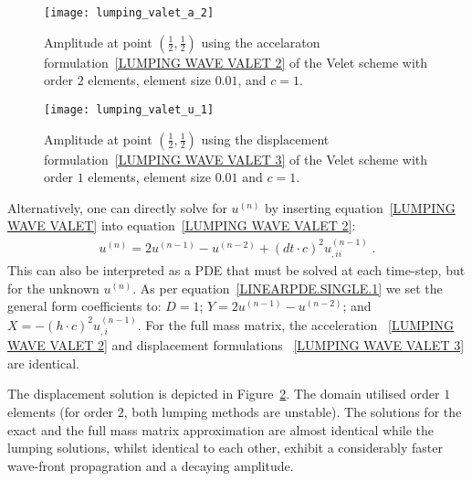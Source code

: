 \begin{figure}[ht]
\centerline{\texttt{[image: lumping\_valet\_a\_2]}}
\caption{Amplitude at point $(\frac{1}{2},\frac{1}{2})$ using the accelaraton formulation~\ref{LUMPING WAVE VALET 2} of the 
Velet scheme with order $2$ elements, element size $0.01$, and $c=1$.}
\label{FIG LUMPING VALET B}
\end{figure}

\begin{figure}[ht]
\centerline{\texttt{[image: lumping\_valet\_u\_1]}}
\caption{Amplitude at point $(\frac{1}{2},\frac{1}{2})$ using the displacement formulation~\ref{LUMPING WAVE VALET 3} of the 
Velet scheme with order $1$ elements, element size $0.01$ and $c=1$.}
\label{FIG LUMPING VALET C}
\end{figure}

Alternatively, one can directly solve for $u^{(n)}$ by inserting 
equation~\ref{LUMPING WAVE VALET} into equation~\ref{LUMPING WAVE VALET 2}:
\begin{eqnarray} \label{LUMPING WAVE VALET 3} 
u^{(n)}=2u^{(n-1)}-u^{(n-2)} + (dt\cdot c)^2 u^{(n-1)}_{,ii} \; .
\end{eqnarray}
This can also be interpreted as a PDE that must be solved at each time-step, but 
for the unknown $u^{(n)}$. 
As per equation~\ref{LINEARPDE.SINGLE.1} we set the general form coefficients to:
$D=1$; $Y=2u^{(n-1)}-u^{(n-2)}$; and $X=-(h\cdot c)^2 u^{(n-1)}_{,i}$. 
For the full mass matrix, the acceleration ~\ref{LUMPING WAVE VALET 2} and displacement formulations ~\ref{LUMPING WAVE VALET 3}
are identical. 

The displacement solution is depicted in Figure~\ref{FIG LUMPING VALET C}. The
domain utilised order $1$ elements (for order $2$, both 
lumping methods are unstable). The solutions for the exact and the full mass 
matrix approximation are almost identical while the lumping solutions, whilst 
identical to each other, exhibit a considerably faster wave-front propagration 
and a decaying amplitude.

